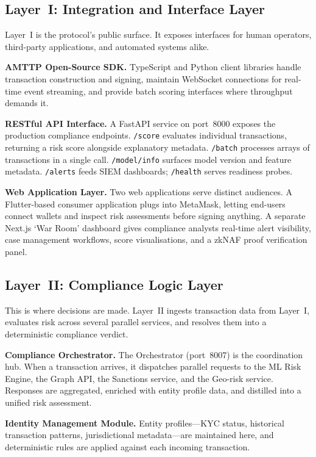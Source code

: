 \documentclass[journal]{IEEEtran}
\begin{document}
\subsection{Layer~I: Integration and Interface Layer}

Layer~I is the protocol's public surface. It exposes interfaces for human operators, third-party applications, and automated systems alike.

\textbf{AMTTP Open-Source SDK.} TypeScript and Python client libraries handle transaction construction and signing, maintain WebSocket connections for real-time event streaming, and provide batch scoring interfaces where throughput demands it.

\textbf{RESTful API Interface.} A FastAPI service on port~8000 exposes the production compliance endpoints. \texttt{/score} evaluates individual transactions, returning a risk score alongside explanatory metadata. \texttt{/batch} processes arrays of transactions in a single call. \texttt{/model/info} surfaces model version and feature metadata. \texttt{/alerts} feeds SIEM dashboards; \texttt{/health} serves readiness probes.

\textbf{Web Application Layer.} Two web applications serve distinct audiences. A Flutter-based consumer application plugs into MetaMask, letting end-users connect wallets and inspect risk assessments before signing anything. A separate Next.js `War Room' dashboard gives compliance analysts real-time alert visibility, case management workflows, score visualisations, and a zkNAF proof verification panel.

\subsection{Layer~II: Compliance Logic Layer}

This is where decisions are made. Layer~II ingests transaction data from Layer~I, evaluates risk across several parallel services, and resolves them into a deterministic compliance verdict.

\textbf{Compliance Orchestrator.} The Orchestrator (port~8007) is the coordination hub. When a transaction arrives, it dispatches parallel requests to the ML Risk Engine, the Graph API, the Sanctions service, and the Geo-risk service. Responses are aggregated, enriched with entity profile data, and distilled into a unified risk assessment.

\textbf{Identity Management Module.} Entity profiles---KYC status, historical transaction patterns, jurisdictional metadata---are maintained here, and deterministic rules are applied against each incoming transaction.
\end{document}
